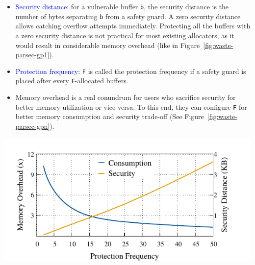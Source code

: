 \documentclass[landscape,a0paper,fontscale=0.3]{baposter} %
\begin{document}
\begin{poster}
{
    \begin{multicols}{2}
        \begin{itemize}
            \item \textcolor{blue}{Security distance}: for a vulnerable buffer \texttt{b}, the security distance is the number of bytes separating \texttt{b} from a safety guard. A zero security distance allows catching overflow attempts immediately. Protecting all the buffers with a zero security distance is not practical for most existing allocators, as it would result in considerable memory overhead (like in Figure~\ref{fig:waste-parsec-gp1}).
            \item \textcolor{blue}{Protection frequency}: \texttt{F} is called the protection frequency if a safety guard is placed after every \texttt{F}-allocated buffers. 
            \item Memory overhead is a real conundrum for users who sacrifice security for better
            memory utilization or vice versa. To this end, they can configure \texttt{F} for better memory consumption and security trade-off (See Figure~\ref{fig:waste-parsec-gpn}).
        \end{itemize}

        \vspace{-0.4cm}

        \centering
        \begin{minipage}[t]{\columnwidth}
            \centering 
            \includegraphics[width=.8\columnwidth]{figures/blackscholes}
            \label{fig:waste-parsec-gpn}		
        \end{minipage}


\end{multicols}}
\end{poster}
\end{document}
